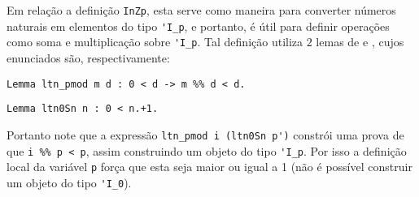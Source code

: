 Em relação a definição \lstinline[language = coq]{InZp}, esta serve como maneira para converter números naturais em elementos do tipo \lstinline[language = coq]{'I_p}, e portanto, é útil para definir operações como soma e multiplicação sobre \lstinline[language = coq]{'I_p}. Tal definição utiliza $2$ lemas de \cite{mathcomp-div} e \cite{mathcomp-ssrnat}, cujos enunciados são, respectivamente:
    \begin{lstlisting}[language=coq,frame=single,tabsize=1]
Lemma ltn_pmod m d : 0 < d -> m %% d < d.
    \end{lstlisting}
    \begin{lstlisting}[language=coq,frame=single,tabsize=1]
Lemma ltn0Sn n : 0 < n.+1.
    \end{lstlisting}
Portanto note que a expressão \lstinline[language = coq]{ltn_pmod i (ltn0Sn p')} constrói uma prova de que \lstinline[language = coq]{i %% p < p}, assim construindo um objeto do tipo \lstinline[language = coq]{'I_p}. Por isso a definição local da variável \lstinline[language = coq]{p} força que esta seja maior ou igual a 1 (não é possível construir um objeto do tipo \lstinline[language = coq]{'I_0}).


